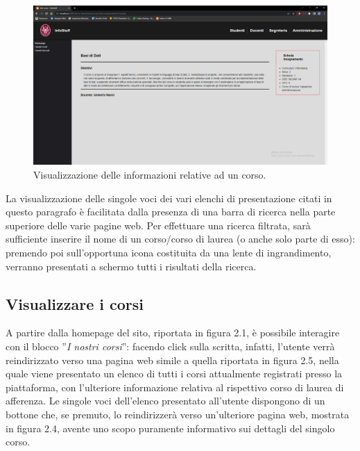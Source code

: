 \documentclass [a4paper,11pt]{book}
\begin{document}
\begin{figure}
\centering
\includegraphics[scale=0.3]{figura2-4.png}
\caption{Visualizzazione delle informazioni relative ad un corso.}
\end{figure}

La visualizzazione delle singole voci dei vari elenchi di presentazione citati in questo paragrafo è facilitata dalla presenza di una barra di ricerca nella parte superiore delle varie pagine web. Per effettuare una ricerca filtrata, sarà sufficiente inserire il nome di un corso/corso di laurea (o anche solo parte di esso): premendo poi sull'opportuna icona costituita da una lente di ingrandimento, verranno presentati a schermo tutti i risultati della ricerca.

\medskip

\subsection{Visualizzare i corsi}

A partire dalla homepage del sito, riportata in figura 2.1, è possibile interagire con il blocco ''\emph{I nostri corsi}'': facendo click sulla scritta, infatti, l'utente verrà reindirizzato verso una pagina web simile a quella riportata in figura 2.5, nella quale viene presentato un elenco di tutti i corsi attualmente registrati presso la piattaforma, con l'ulteriore informazione relativa al rispettivo corso di laurea di afferenza. Le singole voci dell'elenco presentato all'utente dispongono di un bottone che, se premuto, lo reindirizzerà verso un'ulteriore pagina web, mostrata in figura 2.4, avente uno scopo puramente informativo sui dettagli del singolo corso.
\end{document}
